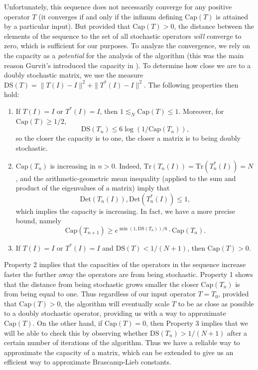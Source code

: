 \documentclass[12pt]{article}
\begin{document}
Unfortunately, this sequence does not necessarily converge for any positive operator $T$ (it converges if and only if the infinum defining $\text{Cap}(T)$ is attained by a particular input). But provided that $\text{Cap}(T) > 0$, the distance between the elements of the sequence to the set of all stochastic operators \emph{will} converge to zero, which is sufficient for our purposes. To analyze the convergence, we rely on the capacity as a \emph{potential} for the analysis of the algorithm (this was the main reason Gurvit's introduced the capacity in \cite{gurv2004}). To determine how close we are to a doubly stochastic matrix, we use the measure $\text{DS}(T) = \| T(I) - I \|^2 + \| T^*(I) - I \|^2$. The following properties then hold:
%
\begin{enumerate}
        \item If $T(I) = I$ or $T^*(I) = I$, then $1 \lesssim_N \text{Cap}(T) \leq 1$. Moreover, for $\text{Cap}(T) \geq 1/2$,
        \[ \text{DS}(T_n) \leq 6 \log(1/\text{Cap}(T_n)), \]
        so the closer the capacity is to one, the closer a matrix is to being doubly stochastic.

        \item $\text{Cap}(T_n)$ is increasing in $n > 0$. Indeed, $\text{Tr}(T_n(I)) = \text{Tr}(T_n^*(I)) = N$, and the arithmetic-geometric mean inequality (applied to the sum and product of the eigenvalues of a matrix) imply that
        \[ \text{Det}(T_n(I)), \text{Det}(T_n^*(I)) \leq 1, \]
        which implies the capacity is increasing. In fact, we have a more precise bound, namely
        \[ \text{Cap}(T_{n+1}) \geq e^{\min(1,\text{DS}(T_n))/6} \cdot \text{Cap}(T_n). \]

        \item If $T(I) = I$ or $T^*(I) = I$ and $\text{DS}(T) < 1/(N+1)$, then $\text{Cap}(T) > 0$.
\end{enumerate}
%
Property 2 implies that the capacities of the operators in the sequence increase faster the further away the operators are from being stochastic. Property 1 shows that the distance from being stochastic grows smaller the closer $\text{Cap}(T_n)$ is from being equal to one. Thus regardless of our input operator $T = T_0$, provided that $\text{Cap}(T) > 0$, the algorithm will eventually scale $T$ to be as close as possible to a doubly stochastic operator, providing us with a way to approximate $\text{Cap}(T)$. On the other hand, if $\text{Cap}(T) = 0$, then Property 3 implies that we will be able to check this by observing whether $\text{DS}(T_n) > 1/(N+1)$ after a certain number of iterations of the algorithm. Thus we have a reliable way to approximate the capacity of a matrix, which can be extended to give us an efficient way to approximate Brascamp-Lieb constants.
\end{document}
